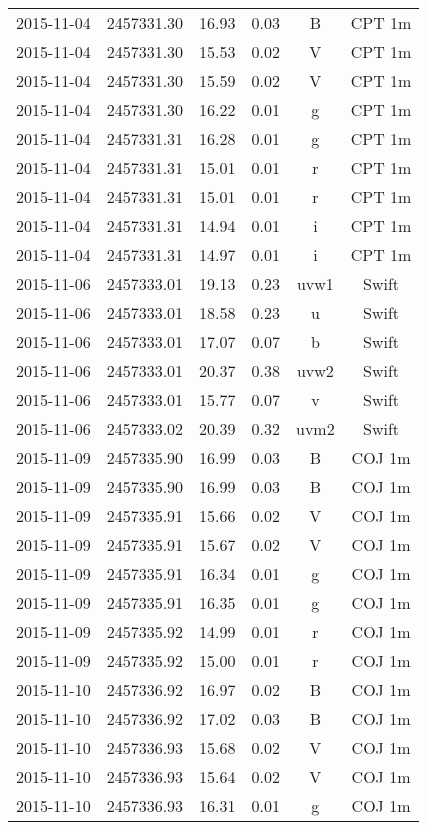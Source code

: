 \begin{table}
\begin{tabular}{cccccc}
2015-11-04 & 2457331.30 & 16.93 & 0.03 & B & CPT 1m \\
2015-11-04 & 2457331.30 & 15.53 & 0.02 & V & CPT 1m \\
2015-11-04 & 2457331.30 & 15.59 & 0.02 & V & CPT 1m \\
2015-11-04 & 2457331.30 & 16.22 & 0.01 & g & CPT 1m \\
2015-11-04 & 2457331.31 & 16.28 & 0.01 & g & CPT 1m \\
2015-11-04 & 2457331.31 & 15.01 & 0.01 & r & CPT 1m \\
2015-11-04 & 2457331.31 & 15.01 & 0.01 & r & CPT 1m \\
2015-11-04 & 2457331.31 & 14.94 & 0.01 & i & CPT 1m \\
2015-11-04 & 2457331.31 & 14.97 & 0.01 & i & CPT 1m \\
2015-11-06 & 2457333.01 & 19.13 & 0.23 & uvw1 & Swift \\
2015-11-06 & 2457333.01 & 18.58 & 0.23 & u & Swift \\
2015-11-06 & 2457333.01 & 17.07 & 0.07 & b & Swift \\
2015-11-06 & 2457333.01 & 20.37 & 0.38 & uvw2 & Swift \\
2015-11-06 & 2457333.01 & 15.77 & 0.07 & v & Swift \\
2015-11-06 & 2457333.02 & 20.39 & 0.32 & uvm2 & Swift \\
2015-11-09 & 2457335.90 & 16.99 & 0.03 & B & COJ 1m \\
2015-11-09 & 2457335.90 & 16.99 & 0.03 & B & COJ 1m \\
2015-11-09 & 2457335.91 & 15.66 & 0.02 & V & COJ 1m \\
2015-11-09 & 2457335.91 & 15.67 & 0.02 & V & COJ 1m \\
2015-11-09 & 2457335.91 & 16.34 & 0.01 & g & COJ 1m \\
2015-11-09 & 2457335.91 & 16.35 & 0.01 & g & COJ 1m \\
2015-11-09 & 2457335.92 & 14.99 & 0.01 & r & COJ 1m \\
2015-11-09 & 2457335.92 & 15.00 & 0.01 & r & COJ 1m \\
2015-11-10 & 2457336.92 & 16.97 & 0.02 & B & COJ 1m \\
2015-11-10 & 2457336.92 & 17.02 & 0.03 & B & COJ 1m \\
2015-11-10 & 2457336.93 & 15.68 & 0.02 & V & COJ 1m \\
2015-11-10 & 2457336.93 & 15.64 & 0.02 & V & COJ 1m \\
2015-11-10 & 2457336.93 & 16.31 & 0.01 & g & COJ 1m \\

\end{tabular}
\end{table}
